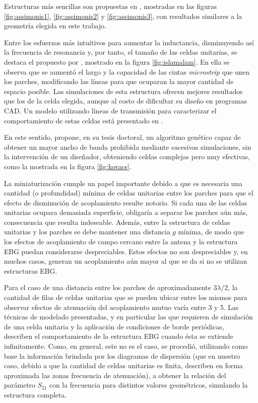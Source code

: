 Estructuras más sencillas son propuestas en \cite{Asimonis:designoptimization}, mostradas en las figuras \ref{fig:assimonis1}, \ref{fig:assimonis2} y \ref{fig:assimonis3}, con resultados similares a la geometría elegida en este trabajo.

Entre los esfuerzos más intuitivos para aumentar la inductancia, disminuyendo así la frecuencia de resonancia y, por tanto, el tamaño de las celdas unitarias, se destaca el propuesto por \cite{IslamAlam:CompactEBG}, mostrado en la figura \ref{fig:islamalam}. En ella se observa que se aumentó el largo y la capacidad de las cintas \textit{microstrip} que unen los parches, modificando las líneas para que ocuparan la mayor cantidad de espacio posible. Las simulaciones de esta estructura ofrecen mejores resultados que los de la celda elegida, aunque al costo de dificultar su diseño en programas \textsc{CAD}. Un modelo utilizando líneas de transmisión para caracterizar el comportamiento de estas celdas está presentado en \cite{Venkateswaran:Thesis}. 

En este sentido, \cite{Kovacs:DesignOptimization} propone, en su tesis doctoral, un algoritmo genético capaz de obtener un mayor ancho de banda prohibida mediante sucesivas simulaciones, sin la intervención de un diseñador, obteniendo celdas complejas pero muy efectivas, como la mostrada en la figura \ref{fig:kovacs}.

La miniaturización cumple un papel importante debido a que es necesaria una cantidad (o profundidad) mínima de celdas unitarias entre los parches para que el efecto de disminución de acoplamiento resulte notorio. Si cada una de las celdas unitarias ocupara demasiada superficie, obligaría a separar los parches aún más, consecuencia que resulta indeseable. Además, entre la estructura de celdas unitarias y los parches se debe mantener una distancia $g$ mínima, de modo que los efectos de acoplamiento de campo cercano entre la antena y la estructura EBG puedan considerarse despreciables. Estos efectos no son despreciables y, en muchos casos, generan un acoplamiento aún mayor al que se da si no se utilizan estructuras EBG.

Para el caso de una distancia entre los parches de aproximadamente $3\lambda/2$, la cantidad de filas de celdas unitarias que se pueden ubicar entre los mismos para observar efectos de atenuación del acoplamiento mutuo varía entre 3 y 5. Las técnicas de modelado presentadas, y en particular las que requieren de simulación de una celda unitaria y la aplicación de condiciones de borde periódicas, describen el comportamiento de la estructura EBG cuando ésta se extiende infinitamente. Como, en general, este no es el caso, se procedió, utilizando como base la información brindada por los diagramas de dispersión (que en nuestro caso, debido a que la cantidad de celdas unitarias es finita, describen en forma aproximada las zonas frecuencia de atenuación), a obtener la relación del parámetro $S_{21}$ con la frecuencia para distintos valores geométricos, simulando la estructura completa.

